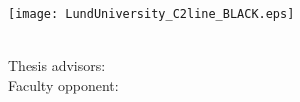 
\frontmatter %

\thispagestyle{empty} %
\begin{center}
\vspace*{5cm}
{\Large \myMainTitle}
\end{center}



\cleardoublepage
\thispagestyle{empty} %
~
\vfill
\begin{center}
{\HUGE \myMainTitle}
\\[2mm]
{\huge \mySubTitle}

\vfill
{\myName}

\vfill
\texttt{[image: LundUniversity\_C2line\_BLACK.eps]}


\vspace{10mm}
{\large \myDegree}\\
{\large Thesis advisors: \myAdvisors}\\
{\large Faculty opponent: \myOpponent}\\
\vfill
{\footnotesize
\myDefenceAnnouncement
}
\\
\end{center}
\vfill

\newpage \thispagestyle{empty} %



